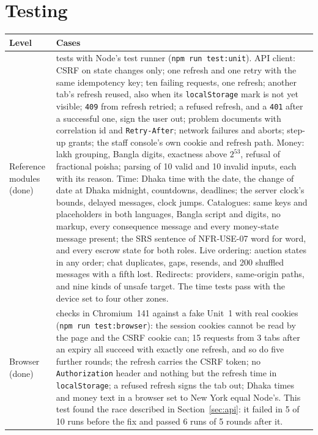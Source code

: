 \documentclass[11pt,a4paper]{article}
\newenvironment{dtable}[1]{\small\begin{longtable}{#1}}{\end{longtable}}
\begin{document}
\section{Testing}
\label{sec:testing}
\begin{dtable}{@{}>{\raggedright\arraybackslash}p{3.2cm}>{\raggedright\arraybackslash}p{12cm}@{}}
\toprule
\textbf{Level} & \textbf{Cases} \\ \midrule \endhead
Reference modules (done) & 46 tests with Node's test runner (\texttt{npm run test:unit}). API client: CSRF on state changes only; one refresh and one retry with the same idempotency key; ten failing requests, one refresh; another tab's refresh reused, also when its \texttt{localStorage} mark is not yet visible; \texttt{409} from refresh retried; a refused refresh, and a \texttt{401} after a successful one, sign the user out; problem documents with correlation id and \texttt{Retry-After}; network failures and aborts; step-up grants; the staff console's own cookie and refresh path. Money: lakh grouping, Bangla digits, exactness above $2^{53}$, refusal of fractional poisha; parsing of 10 valid and 10 invalid inputs, each with its reason. Time: Dhaka time with the date, the change of date at Dhaka midnight, countdowns, deadlines; the server clock's bounds, delayed messages, clock jumps. Catalogues: same keys and placeholders in both languages, Bangla script and digits, no markup, every consequence message and every money-state message present; the SRS sentence of NFR-USE-07 word for word, and every escrow state for both roles. Live ordering: auction states in any order; chat duplicates, gaps, resends, and 200 shuffled messages with a fifth lost. Redirects: providers, same-origin paths, and nine kinds of unsafe target. The time tests pass with the device set to four other zones. \\
Browser (done) & 12 checks in Chromium~141 against a fake Unit~1 with real cookies (\texttt{npm run test:browser}): the session cookies cannot be read by the page and the CSRF cookie can; 15 requests from 3 tabs after an expiry all succeed with exactly one refresh, and so do five further rounds; the refresh carries the CSRF token; no \texttt{Authorization} header and nothing but the refresh time in \texttt{localStorage}; a refused refresh signs the tab out; Dhaka times and money text in a browser set to New York equal Node's. This test found the race described in Section~\ref{sec:api}: it failed in 5 of 10 runs before the fix and passed 6 runs of 5 rounds after it. \\

\end{dtable}
\end{document}
